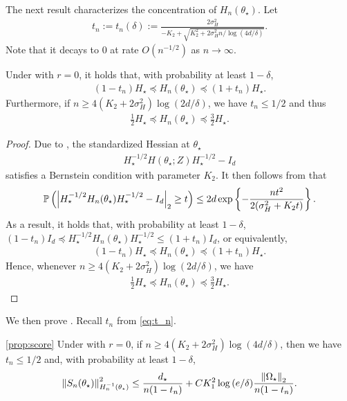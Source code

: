The next result characterizes the concentration of $H_n(\theta_\star)$.
Let
\begin{align}\label{eq:t_n}
    t_n := t_n(\delta) := \frac{2\sigma_H^2}{-K_2 + \sqrt{K_2^2 + 2\sigma_H^2 n/\log{(4d/\delta)}}}.
\end{align}
Note that it decays to 0 at rate $O(n^{-1/2})$ as $n \rightarrow \infty$.
\begin{lemma}\label{lem:hessian}
    Under  with $r = 0$, it holds that, with probability at least $1 - \delta$,
    \begin{align*}
        (1 - t_n) H_\star \preceq H_n(\theta_\star) \preceq (1 + t_n) H_\star.
    \end{align*}
    Furthermore, if $n \ge 4(K_2 + 2\sigma_H^2) \log{(2d/\delta)}$, we have $t_n \le 1/2$ and thus
    \begin{align*}
        \frac12 H_\star \preceq H_n(\theta_\star) \preceq \frac32 H_\star.
    \end{align*}
\end{lemma}
\begin{proof}
    Due to , the standardized Hessian at $\theta_\star$
    \begin{align*}
        H_\star^{-1/2} H(\theta_\star; Z) H_\star^{-1/2} - I_d
    \end{align*}
    satisfies a Bernstein condition with parameter $K_2$.
    It then follows from  that
    \begin{align*}
        \operatorname{\mathbb P}\left( \left| H_\star^{-1/2} H_n(\theta_\star) H_\star^{-1/2} - I_d \right|_2 \ge t \right) \le 2d \exp\left\{-\frac{nt^2}{2(\sigma_H^2 + K_2 t)} \right\}.
    \end{align*}
    As a result, it holds that, with probability at least $1 - \delta$,
    $(1 - t_n)I_d \preceq H_\star^{-1/2} H_n(\theta_\star) H_\star^{-1/2} \le (1 + t_n)I_d$, or equivalently,
    \begin{align*}
        (1 - t_n) H_\star \preceq H_n(\theta_\star) \preceq (1 + t_n) H_\star.
    \end{align*}
    Hence, whenever $n \ge 4(K_2 + 2\sigma_H^2) \log{(2d/\delta)}$, we have
    \begin{align*}
        \frac12 H_\star \preceq H_n(\theta_\star) \preceq \frac32 H_\star.
    \end{align*}
\end{proof}

We then prove .
Recall $t_n$ from \eqref{eq:t_n}.
\begin{customprop}{\ref{prop:score}}
    Under  with $r = 0$, if $n \ge 4(K_2 + 2\sigma_H^2) \log{(4d/\delta)}$, then we have $t_n \le 1/2$ and, with probability at least $1 - \delta$,
    \begin{align*}
        \left\lVert S_n(\theta_\star) \right\rVert_{H_n^{-1}(\theta_\star)}^2
        \le \frac{d_\star}{n(1-t_n)} + C K_{1}^2 \log{(e / \delta)} \frac{\left\lVert \Omega_\star \right\rVert_2}{n(1-t_n)}.
    \end{align*}
\end{customprop}

